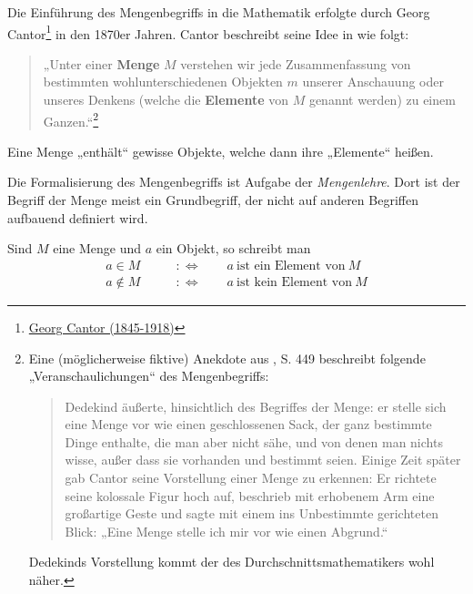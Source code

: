 \begin{defin}[Mengen] \label{mengenimlogikkapitel}
    Die Einführung des Mengenbegriffs in die Mathematik erfolgte durch Georg Cantor\footnote{\href{https://de.wikipedia.org/wiki/Georg_Cantor}{Georg Cantor (1845-1918)}} in den 1870er Jahren. Cantor beschreibt seine Idee in \cite{Can95} wie folgt:
    \begin{quote}
        „Unter einer \textbf{Menge} $M$ verstehen wir jede Zusammenfassung von bestimmten wohlunterschiedenen Objekten $m$ unserer Anschauung oder unseres Denkens (welche die \textbf{Elemente} von $M$ genannt werden) zu einem Ganzen.“\footnote{Eine (möglicherweise fiktive) Anekdote aus \cite{Ded32}, S. 449 beschreibt folgende „Veranschaulichungen“ des Mengenbegriffs:
    \begin{quote}
        Dedekind äußerte, hinsichtlich des Begriffes der Menge: er stelle sich eine Menge vor wie einen geschlossenen Sack, der ganz bestimmte Dinge enthalte, die man aber nicht sähe, und von denen man nichts wisse, außer dass sie vorhanden und bestimmt seien. Einige Zeit später gab Cantor seine Vorstellung einer Menge zu erkennen: Er richtete seine kolossale Figur hoch auf, beschrieb mit erhobenem Arm eine großartige Geste und sagte mit einem ins Unbestimmte gerichteten Blick: „Eine Menge stelle ich mir vor wie einen Abgrund.“
    \end{quote}
    Dedekinds Vorstellung kommt der des Durchschnittsmathematikers wohl näher.}
    \end{quote}
    Eine Menge „enthält“ gewisse Objekte, welche dann ihre „Elemente“ heißen.

    Die Formalisierung des Mengenbegriffs ist Aufgabe der \emph{Mengenlehre}. Dort ist der Begriff der Menge meist ein Grundbegriff, der nicht auf anderen Begriffen aufbauend definiert wird.
\end{defin}


\begin{nota}[Elementzeichen]
    Sind $M$ eine Menge und $a$ ein Objekt, so schreibt man
    \begin{align*}
        a\in M\qquad&:\Leftrightarrow\qquad a\ \text{ist ein Element von}\ M \\
        a\notin M\qquad&:\Leftrightarrow\qquad a\ \text{ist kein Element von}\ M
    \end{align*}
\end{nota}


